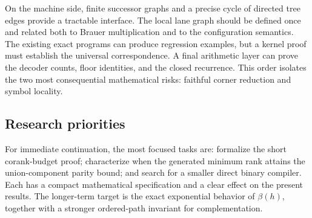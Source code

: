 On the machine side, finite successor graphs and a precise
cycle of directed tree edges provide a tractable interface.
The local lane graph should be defined once and related both
to Brauer multiplication and to the configuration semantics.
The existing exact programs can produce regression examples,
but a kernel proof must establish the universal correspondence.
A final arithmetic layer can prove the decoder counts, floor
identities, and the closed recurrence. This order isolates
the two most consequential mathematical risks: faithful
corner reduction and symbol locality.

\subsection{Research priorities}

For immediate continuation, the most focused tasks are:
formalize the short corank-budget proof; characterize when
the generated minimum rank attains the union-component
parity bound; and search for a smaller direct binary compiler.
Each has a compact mathematical specification and a clear
effect on the present results. The longer-term target is
the exact exponential behavior of $\beta(h)$, together
with a stronger ordered-path invariant for complementation.

